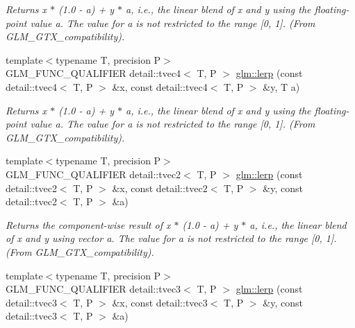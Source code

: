 \begin{CompactItemize}
\begin{CompactList}\small\item\em Returns x $\ast$ (1.0 - a) + y $\ast$ a, i.e., the linear blend of x and y using the floating-point value a. The value for a is not restricted to the range \mbox{[}0, 1\mbox{]}. (From GLM\_\-GTX\_\-compatibility). \item\end{CompactList}\item 
\hypertarget{group__gtx__compatibility_g85ea6e54085bb3e43965178e8dd371b9}{
{\footnotesize template$<$typename T, precision P$>$ }\\GLM\_\-FUNC\_\-QUALIFIER detail::tvec4$<$ T, P $>$ \hyperlink{group__gtx__compatibility_g85ea6e54085bb3e43965178e8dd371b9}{glm::lerp} (const detail::tvec4$<$ T, P $>$ \&x, const detail::tvec4$<$ T, P $>$ \&y, T a)}
\label{group__gtx__compatibility_g85ea6e54085bb3e43965178e8dd371b9}

\begin{CompactList}\small\item\em Returns x $\ast$ (1.0 - a) + y $\ast$ a, i.e., the linear blend of x and y using the floating-point value a. The value for a is not restricted to the range \mbox{[}0, 1\mbox{]}. (From GLM\_\-GTX\_\-compatibility). \item\end{CompactList}\item 
\hypertarget{group__gtx__compatibility_g28d724046d8f648374b148b2a8ada608}{
{\footnotesize template$<$typename T, precision P$>$ }\\GLM\_\-FUNC\_\-QUALIFIER detail::tvec2$<$ T, P $>$ \hyperlink{group__gtx__compatibility_g28d724046d8f648374b148b2a8ada608}{glm::lerp} (const detail::tvec2$<$ T, P $>$ \&x, const detail::tvec2$<$ T, P $>$ \&y, const detail::tvec2$<$ T, P $>$ \&a)}
\label{group__gtx__compatibility_g28d724046d8f648374b148b2a8ada608}

\begin{CompactList}\small\item\em Returns the component-wise result of x $\ast$ (1.0 - a) + y $\ast$ a, i.e., the linear blend of x and y using vector a. The value for a is not restricted to the range \mbox{[}0, 1\mbox{]}. (From GLM\_\-GTX\_\-compatibility). \item\end{CompactList}\item 
\hypertarget{group__gtx__compatibility_g37451637585efa0717dd1a819d7ad193}{
{\footnotesize template$<$typename T, precision P$>$ }\\GLM\_\-FUNC\_\-QUALIFIER detail::tvec3$<$ T, P $>$ \hyperlink{group__gtx__compatibility_g37451637585efa0717dd1a819d7ad193}{glm::lerp} (const detail::tvec3$<$ T, P $>$ \&x, const detail::tvec3$<$ T, P $>$ \&y, const detail::tvec3$<$ T, P $>$ \&a)}
\label{group__gtx__compatibility_g37451637585efa0717dd1a819d7ad193}


\end{CompactItemize}
